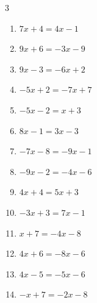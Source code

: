 \begin{multicols}{3}
\begin{enumerate}
  \item $7x+4=4x-1$


  \item $9x+6=-3x-9$


  \item $9x-3=-6x+2$


\columnbreak %

  \item $-5x+2=-7x+7$


  \item $-5x-2=x+3$


  \item $8x-1=3x-3$


  \item $-7x-8=-9x-1$


  \item $-9x-2=-4x-6$


  \item $4x+4=5x+3$

        \phantom{$\displaystyle x=1$}

  \item $-3x+3=7x-1$


  \item $x+7=-4x-8$

        \phantom{$\displaystyle x=-3$}

  \item $4x+6=-8x-6$

        \phantom{$\displaystyle x=-1$}

  \item $4x-5=-5x-6$


  \item $-x+7=-2x-8$


\end{enumerate}
\end{multicols}

